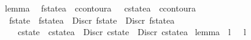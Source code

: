 %
\begin{isabellebody}%
\def\isabellecontext{AbsCFCorrect}%
\isamarkuptrue%
\isamarkupfalse%
\ lemma{}{}{\isacharcolon}\isanewline
\ \ fstate{\isacharunderscore}a\ {\isacharcolon}{\isacharcolon}\ {\isachardoublequoteopen}{\isacharprime}c{\isacharcolon}{\isacharcolon}contour{\isacharunderscore}a\ {\isasymafstate}{\isachardoublequoteclose}\ \ cstate{\isacharunderscore}a\ {\isacharcolon}{\isacharcolon}\ {\isachardoublequoteopen}{\isacharprime}c{\isacharcolon}{\isacharcolon}contour{\isacharunderscore}a\ {\isasymacstate}{\isachardoublequoteclose}\isanewline
\ \ {\isachardoublequoteopen}{\isacharbar}fstate{\isacharbar}\ {\isasymlessapprox}\ fstate{\isacharunderscore}a\ {\isasymLongrightarrow}\ {\isacharbar}{\isasymF}{\isasymcdot}{\isacharparenleft}Discr\ fstate{\isacharparenright}{\isacharbar}\ {\isasymlessapprox}\ {\isasymaF}{\isasymcdot}{\isacharparenleft}Discr\ fstate{\isacharunderscore}a{\isacharparenright}{\isachardoublequoteclose}\isanewline
\ \ \ \ {\isachardoublequoteopen}{\isacharbar}cstate{\isacharbar}\ {\isasymlessapprox}\ cstate{\isacharunderscore}a\ {\isasymLongrightarrow}\ {\isacharbar}{\isasymC}{\isasymcdot}{\isacharparenleft}Discr\ cstate{\isacharparenright}{\isacharbar}\ {\isasymlessapprox}\ {\isasymaC}{\isasymcdot}{\isacharparenleft}Discr\ cstate{\isacharunderscore}a{\isacharparenright}{\isachardoublequoteclose}\isanewline
%
\isanewline%
\isamarkuptrue%
\isamarkupfalse%
\ lemma{}{\isacharcolon}\ {\isachardoublequoteopen}{\isacharbar}{\isasymPR}\ l{\isacharbar}\ {\isasymlessapprox}\ {\isasymaPR}\ l{\isachardoublequoteclose}
\end{isabellebody}%
